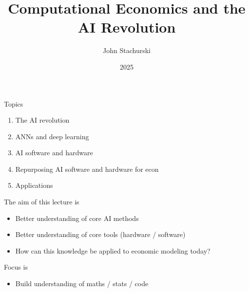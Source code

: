 


\title{Computational Economics and the AI Revolution}



\author{John Stachurski}


\date{2025}




\begin{frame}
  \titlepage
\end{frame}



\begin{frame}{Topics}

    \begin{enumerate}
        \item The AI revolution
        \vspace{0.5em}
        \item ANNs and deep learning
        \vspace{0.5em}
        \item AI software and hardware
        \vspace{0.5em}
        \item Repurposing AI software and hardware for econ
        \vspace{0.5em}
        \item Applications
    \end{enumerate}

\end{frame}

\begin{frame}
    
    The aim of this lecture is 
    \medskip


    \begin{itemize}
        \item Better understanding of core AI methods
        \medskip
        \item Better understanding of core tools (hardware / software)
        \medskip
        \item How can this knowledge be applied to economic modeling today?
    \end{itemize}

    \medskip
    \medskip
    Focus is 
    \medskip


    \begin{itemize}
        \item Build understanding of maths / stats / code
    \end{itemize}

\end{frame}





